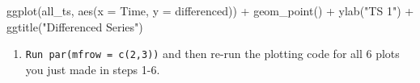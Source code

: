 \documentclass[
  letterpaper,
  DIV=11,
  numbers=noendperiod]{scrartcl}
\newenvironment{Shaded}{\begin{snugshade}}{\end{snugshade}}
\newcommand{\AttributeTok}[1]{\textcolor[rgb]{0.40,0.45,0.13}{#1}}
\newcommand{\FunctionTok}[1]{\textcolor[rgb]{0.28,0.35,0.67}{#1}}
\newcommand{\NormalTok}[1]{\textcolor[rgb]{0.00,0.23,0.31}{#1}}
\newcommand{\SpecialCharTok}[1]{\textcolor[rgb]{0.37,0.37,0.37}{#1}}
\newcommand{\StringTok}[1]{\textcolor[rgb]{0.13,0.47,0.30}{#1}}
\providecommand{\tightlist}{%
  \setlength{\itemsep}{0pt}\setlength{\parskip}{0pt}}\usepackage{longtable,booktabs,array}
\begin{document}
\begin{Shaded}
\begin{Highlighting}[]
\FunctionTok{ggplot}\NormalTok{(all\_ts, }\FunctionTok{aes}\NormalTok{(}\AttributeTok{x =}\NormalTok{ Time, }\AttributeTok{y =}\NormalTok{ differenced)) }\SpecialCharTok{+} \FunctionTok{geom\_point}\NormalTok{() }\SpecialCharTok{+} 
  \FunctionTok{ylab}\NormalTok{(}\StringTok{"TS 1"}\NormalTok{) }\SpecialCharTok{+} \FunctionTok{ggtitle}\NormalTok{(}\StringTok{"Differenced Series"}\NormalTok{)}
\end{Highlighting}
\end{Shaded}

\begin{enumerate}
\def\labelenumi{\arabic{enumi}.}
\setcounter{enumi}{6}
\tightlist
\item
  \texttt{Run\ par(mfrow\ =\ c(2,3))} and then re-run the plotting code
  for all 6 plots you just made in steps 1-6.
\end{enumerate}
\end{document}
